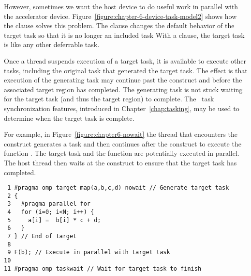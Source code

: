 \begin{figure*}[!tb]
\centering
{}
\caption{ \textbf{The target task as a deferrable task} -- \small
        The nowait clause makes the target task a deferrable task.  The
        generating task may now be scheduled to execute before the target
        task is complete.  The effect is that the generating task may
        execute in parallel with the target task.
        }
\label{figure:chapter-6-device-task-model2}
\end{figure*}

However, sometimes we want the host device to do useful work in parallel with
the accelerator device. Figure~\ref{figure:chapter-6-device-task-model2} shows
how the  clause solves this problem.  The  clause
changes the default behavior of the target task so that it is no longer an
included task %
With a 
clause, the target task is like any other deferrable task.  

Once a thread suspends execution of a target task, it is available to execute
other tasks, including the original task that generated the target task.  The
effect is that execution of the generating task may continue past the
 construct and before the associated target region has completed.
The generating task is not stuck waiting for the target task (and thus the
target region) to complete.  The \OMP\ task synchronization features,
introduced in Chapter~\ref{chap:tasking}, may be used to determine
when the target task is complete.

For example, in Figure~\ref{figure:chapter6-nowait} the thread that encounters the
 construct generates a task and then continues after the
construct to execute the function .  The target task
and the function  are potentially executed in parallel.  The host
thread then waits at the  construct to ensure that the target
task has completed.

\begin{figure*}[!tbh]
\begin{verbatim}
 1 #pragma omp target map(a,b,c,d) nowait // Generate target task
 2 {
 3   #pragma parallel for
 4   for (i=0; i<N; i++) {
 5     a[i] =  b[i] * c + d;
 6   }
 7 } // End of target
 8 
 9 F(b); // Execute in parallel with target task
10
11 #pragma omp taskwait // Wait for target task to finish
\end{verbatim}
\caption{ \textbf {Code fragment with a target nowait region} -- \small
          The encountering thread generates a target task 
          and then continues past the target construct
          to execute the function \emph{F()}.
         }
\label{figure:chapter6-nowait}
\end{figure*}

